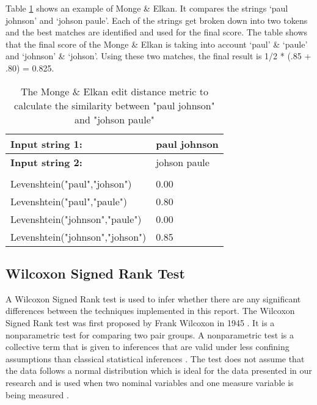 Table \ref{mongeTable} shows an example of Monge \& Elkan. It compares the strings `paul johnson' and `johson paule'. Each of the strings get broken down into two tokens and the best matches are identified and used for the final score. The table shows that the final score of the Monge \& Elkan is taking into account `paul' \& `paule' and `johnson' \& `johson'. Using these two matches, the final result is 1/2 * (.85 + .80) = 0.825.

\begin{table}[H]
\centering

\begin{tabular}{|l|l|}
\hline
\textbf{Input string 1:}        & paul johnson \\ \hline
\textbf{Input string 2:}        & johson paule \\ \hline
                                &              \\ \hline
Levenshtein("paul","johson")    & 0.00         \\ \hline
Levenshtein("paul","paule")     & 0.80         \\ \hline
Levenshtein("johnson","paule")  & 0.00         \\ \hline
Levenshtein("johnson","johson") & 0.85         \\ \hline
\end{tabular}
\caption{The Monge \& Elkan edit distance metric to calculate the similarity between "paul johnson" and "johson paule"}
\label{mongeTable}
\end{table}



\subsection{Wilcoxon Signed Rank Test}

A Wilcoxon Signed Rank test is used to infer whether there are any significant differences between the techniques implemented in this report. The Wilcoxon Signed Rank test was first proposed by Frank Wilcoxon in 1945 \cite{wilcoxon1945individual}. It is a nonparametric test for comparing two pair groups. A nonparametric test is a collective term that is given to inferences that are valid under less confining assumptions than classical statistical inferences \cite{nonparametric}. The test does not assume that the data follows a normal distribution which is ideal for the data presented in our research and is used when two nominal variables and one measure variable is being measured \cite{mcdonald2009handbook}.

